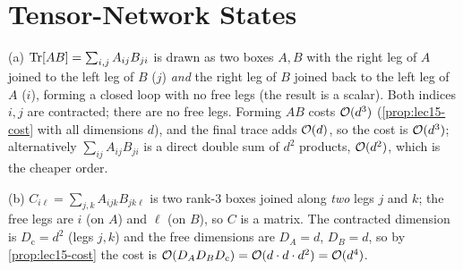 \chapter{Tensor-Network States}

\begin{solution}
(a) $\operatorname{Tr}[AB]=\sum_{i,j}A_{ij}B_{ji}$ is drawn as two boxes $A,B$ with the right leg
of $A$ joined to the left leg of $B$ ($j$) \emph{and} the right leg of $B$ joined
back to the left leg of $A$ ($i$), forming a closed loop with no free legs (the
result is a scalar). Both indices $i,j$ are contracted; there are no free legs.
Forming $AB$ costs $\mathcal{O}(d^{3})$ (\cref{prop:lec15-cost} with all dimensions $d$),
and the final trace adds $\mathcal{O}(d)$, so the cost is $\mathcal{O}(d^{3})$; alternatively
$\sum_{ij}A_{ij}B_{ji}$ is a direct double sum of $d^{2}$ products, $\mathcal{O}(d^{2})$,
which is the cheaper order.

(b) $C_{i\ell}=\sum_{j,k}A_{ijk}B_{jk\ell}$ is two rank-$3$ boxes joined along
\emph{two} legs $j$ and $k$; the free legs are $i$ (on $A$) and $\ell$ (on $B$),
so $C$ is a matrix. The contracted dimension is $D_{\mathrm c}=d^{2}$ (legs $j,k$)
and the free dimensions are $D_A=d$, $D_B=d$, so by \cref{prop:lec15-cost} the cost
is $\mathcal{O}(D_A D_B D_{\mathrm c})=\mathcal{O}(d\cdot d\cdot d^{2})=\mathcal{O}(d^{4})$.
\end{solution}


